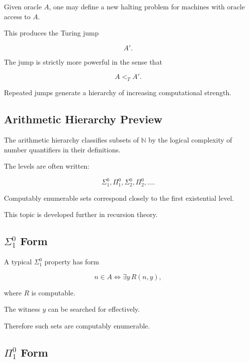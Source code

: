 Given oracle \(A\), one may define a new halting problem for machines with
oracle access to \(A\).

This produces the Turing jump

\[
\boxed{
A'.
}
\]

The jump is strictly more powerful in the sense that

\[
\boxed{
A
<_T
A'.
}
\]

Repeated jumps generate a hierarchy of increasing computational strength.

\subsection{Arithmetic Hierarchy Preview}
\label{subsec:arithmetic-hierarchy-preview}

The arithmetic hierarchy classifies subsets of \(\mathbb{N}\) by the
logical complexity of number quantifiers in their definitions.

The levels are often written:

\[
\boxed{
\Sigma^0_1,
\Pi^0_1,
\Sigma^0_2,
\Pi^0_2,
\ldots.
}
\]

Computably enumerable sets correspond closely to the first existential
level.

This topic is developed further in recursion theory.

\subsection{\(\Sigma^0_1\) Form}
\label{subsec:sigma-one-form}

A typical \(\Sigma^0_1\) property has form

\[
\boxed{
n\in A
\iff
\exists y\,R(n,y),
}
\]

where \(R\) is computable.

The witness \(y\) can be searched for effectively.

Therefore such sets are computably enumerable.

\subsection{\(\Pi^0_1\) Form}
\label{subsec:pi-one-form}

